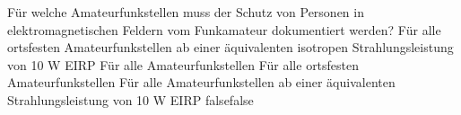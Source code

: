     {Für welche Amateurfunkstellen muss der Schutz von Personen in elektromagnetischen Feldern vom Funkamateur dokumentiert werden?}
    {Für alle ortsfesten Amateurfunkstellen ab einer äquivalenten isotropen Strahlungsleistung von 10 W EIRP}
    {Für alle Amateurfunkstellen}
    {Für alle ortsfesten Amateurfunkstellen}
    {Für alle Amateurfunkstellen ab einer äquivalenten Strahlungsleistung von 10 W EIRP}
    {false}{false}